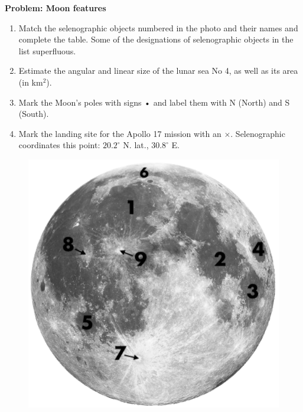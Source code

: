 \documentclass[a4paper,12pt]{extarticle}
\begin{document}
\textsf{\textbf{\large Problem: Moon features}}
\begin{enumerate}
	\item Match the selenographic objects numbered in the photo and their names and complete the table. Some of the designations of selenographic objects in the list superfluous.
	\item Estimate the angular and linear size of the lunar sea No 4, as well as its area (in km$^2$).
	\item Mark the Moon's poles with signs • and label them with N (North) and S (South).
	\item Mark the landing site for the Apollo 17 mission with an $\times$. Selenographic coordinates this point: $20.2^\circ$ N. lat., $30.8^\circ$ E.
\end{enumerate}
\begin{figure}[H]
	\centering
	\includegraphics[width=0.8\linewidth]{moon2.png}
\end{figure}
\end{document}

